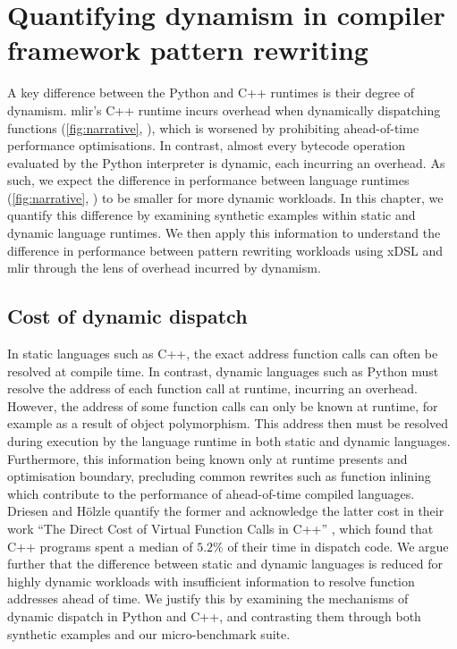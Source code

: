 \chapter{Quantifying dynamism in compiler framework pattern rewriting}
\label{chap:dynamism-pattern-rewriting}

A key difference between the Python and C++ runtimes is their degree of dynamism.
\ac{mlir}'s C++ runtime incurs overhead when dynamically dispatching functions (\autoref{fig:narrative}, ), which is worsened by prohibiting ahead-of-time performance optimisations. In contrast, almost every bytecode operation evaluated by the Python interpreter is dynamic, each incurring an overhead.
As such, we expect the difference in performance between language runtimes (\autoref{fig:narrative}, ) to be smaller for more dynamic workloads.
In this chapter, we quantify this difference by examining synthetic examples within static and dynamic language runtimes. We then apply this information to understand the difference in performance between pattern rewriting workloads using xDSL and \ac{mlir} through the lens of overhead incurred by dynamism.


\section{Cost of dynamic dispatch}
\label{sec:dynamism-pattern-rewriting-dispatch}

In static languages such as C++, the exact address function calls can often be resolved at compile time. In contrast, dynamic languages such as Python must resolve the address of each function call at runtime, incurring an overhead.
However, the address of some function calls can only be known at runtime, for example as a result of object polymorphism. This address then must be resolved during execution by the language runtime in both static and dynamic languages. Furthermore, this information being known only at runtime presents and optimisation boundary, precluding common rewrites such as function inlining which contribute to the performance of ahead-of-time compiled languages.
Driesen and H\"olzle quantify the former and acknowledge the latter cost in their work ``The Direct Cost of Virtual Function Calls in C++'' \cite{driesenDirectCostVirtual1996}, which found that C++ programs spent a median of $5.2\%$ of their time in dispatch code. %
We argue further that the difference between static and dynamic languages is reduced for highly dynamic workloads with insufficient information to resolve function addresses ahead of time.
We justify this by examining the mechanisms of dynamic dispatch in Python and C++, and contrasting them through both synthetic examples and our micro-benchmark suite.

